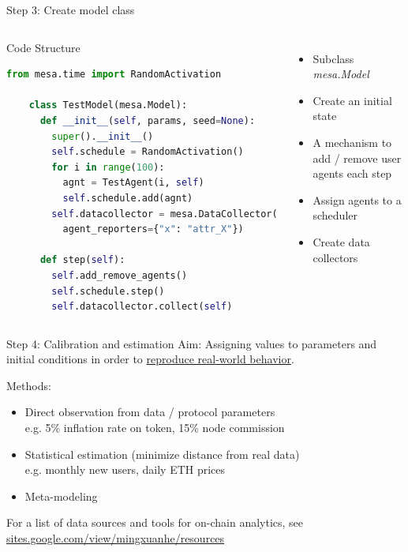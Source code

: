 \documentclass{beamer}
\begin{document}
\begin{frame}[fragile]{Step 3: Create model class}
    \begin{columns}

        \begin{block}{Code Structure}
            \begin{lstlisting}[language=Python, basicstyle=\footnotesize, xleftmargin=-16pt, columns=fullflexible]
    from mesa.time import RandomActivation
    
    class TestModel(mesa.Model):
      def __init__(self, params, seed=None):
        super().__init__()
        self.schedule = RandomActivation()
        for i in range(100):
          agnt = TestAgent(i, self)
          self.schedule.add(agnt)
        self.datacollector = mesa.DataCollector(
          agent_reporters={"x": "attr_X"})
        
      def step(self):
        self.add_remove_agents()
        self.schedule.step()
        self.datacollector.collect(self)
    \end{lstlisting}
        \end{block}

        \begin{itemize}
            \item Subclass \textit{mesa.Model}
            \item Create an initial state
            \item A mechanism to add / remove user agents each step
            \item Assign agents to a scheduler
            \item Create data collectors
        \end{itemize}

    \end{columns}

\end{frame}


\begin{frame}[fragile]{Step 4: Calibration and estimation}
    Aim: Assigning values to parameters and initial conditions in order to \underline{reproduce real-world behavior}.

    \bigskip
    
    Methods:
    \begin{itemize}
        \item Direct observation from data / protocol parameters\\
        e.g. 5\% inflation rate on token, 15\% node commission
        \item Statistical estimation (minimize distance from real data)\\
        e.g. monthly new users, daily ETH prices
        \item Meta-modeling
    \end{itemize}
    For a list of data sources and tools for on-chain analytics, see \href{https://sites.google.com/view/mingxuanhe/resources}{\underline{sites.google.com/view/mingxuanhe/resources}}
\end{frame}
\end{document}
